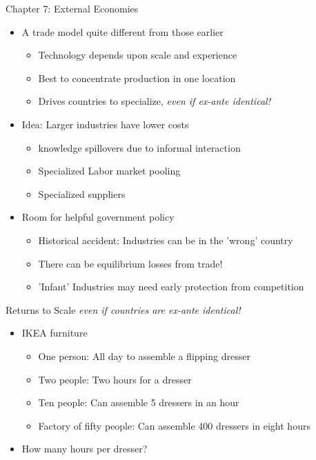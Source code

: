 \documentclass[ignorenonframetext,]{beamer}
\begin{document}
\begin{frame}{Chapter 7: External Economies}

    \begin{itemize}
        \item A trade model quite different from those earlier 
            \begin{itemize}
            \item Technology depends upon scale and experience
            \item Best to concentrate production in one location
            \item Drives countries to specialize, \emph{even if ex-ante identical!}
        \end{itemize}
        \item Idea: Larger industries have lower costs
        \begin{itemize}
            \item knowledge spillovers due to informal interaction
            \item Specialized Labor market pooling
            \item Specialized suppliers
        \end{itemize}
        \item Room for helpful government policy 
        \begin{itemize}
            \item Historical accident: Industries can be in the 'wrong' country 
            \item There can be equilibrium losses from trade!
            \item 'Infant' Industries may need early protection from competition
        \end{itemize}
    \end{itemize}
            
\end{frame}

\begin{frame}{Returns to Scale}
 \emph{even if countries are ex-ante identical!}
    \begin{itemize}
        \item IKEA furniture
        \begin{itemize}
            \item One person: All day to assemble a flipping dresser
            \item Two people: Two hours for a dresser
            \item Ten people: Can assemble 5 dressers in an hour 
            \item Factory of fifty people: Can assemble 400 dressers in eight hours
        \end{itemize}
        \item How many hours per dresser?
    \end{itemize}

\end{frame}
\end{document}
